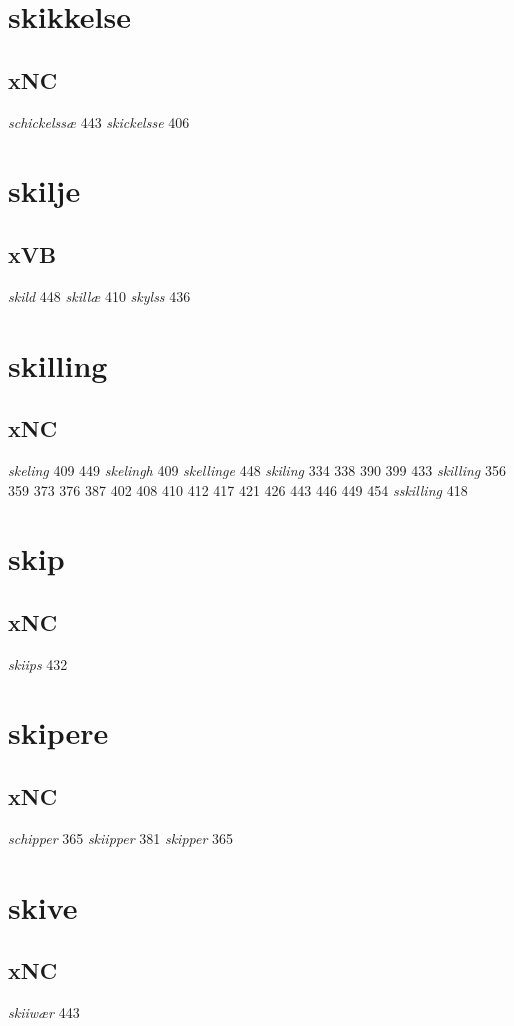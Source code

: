 \documentclass[a4paper,twocolumn]{article}
\begin{document}
\section{skikkelse}
\label{sec:orge7bdcfc}
\subsection{xNC}
\label{sec:orgf033104}
\emph{schickelssæ} 443 \emph{skickelsse} 406 
\section{skilje}
\label{sec:orgd05ecea}
\subsection{xVB}
\label{sec:org3c18587}
\emph{skild} 448 \emph{skillæ} 410 \emph{skylss} 436 
\section{skilling}
\label{sec:orge1eedaa}
\subsection{xNC}
\label{sec:orgde0ce4a}
\emph{skeling} 409 449 \emph{skelingh} 409 \emph{skellinge} 448 \emph{skiling} 334 338 390 399 433 \emph{skilling} 356 359 373 376 387 402 408 410 412 417 421 426 443 446 449 454 \emph{sskilling} 418 
\section{skip}
\label{sec:org18c0c57}
\subsection{xNC}
\label{sec:org8bd36e6}
\emph{skiips} 432 
\section{skipere}
\label{sec:orge61dece}
\subsection{xNC}
\label{sec:org995e826}
\emph{schipper} 365 \emph{skiipper} 381 \emph{skipper} 365 
\section{skive}
\label{sec:orgf604918}
\subsection{xNC}
\label{sec:orga002af5}
\emph{skiiwær} 443 
\end{document}
